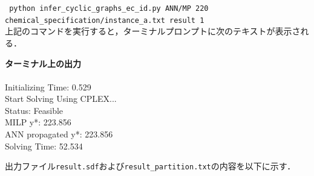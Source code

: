 \documentclass[11pt,titlepage,dvipdfmx,twoside]{jsbook}
\begin{document}
{\tt 
 python infer\_cyclic\_graphs\_ec\_id.py 
ANN/MP
220 \\
 \phantom{python }
chemical\_specification/instance\_a.txt
result
1
 }\\


上記のコマンドを実行すると，ターミナルプロンプトに次のテキストが表示される．

\bigskip

\begin{oframed}
{\bf ターミナル上の出力}\\\\
 Initializing Time: 0.529  \\
Start Solving Using CPLEX...\\
Status: Feasible 		\\
MILP y*: 223.856 		\\
ANN propagated y*: 223.856 \\
Solving Time: 52.534       
\end{oframed}

出力ファイル{\tt result.sdf}および{\tt result\_partition.txt}の内容を以下に示す．

\bigskip
\end{document}
